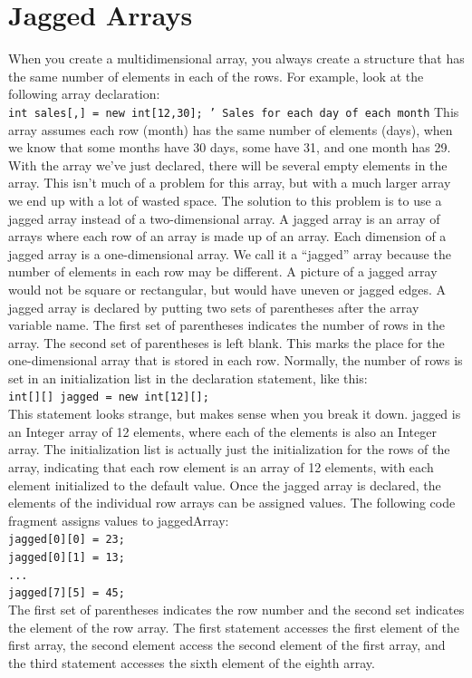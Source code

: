 \documentclass[12pt,a4paper,final,twoside,titlepage]{book}
\begin{document}
\section{Jagged Arrays}
When you create a multidimensional array, you always create a structure that has the same number of elements in each of the rows. For example, look at the following array declaration:\\
\texttt{int sales[,] = new int[12,30]; ' Sales for each day of each month}
This array assumes each row (month) has the same number of elements (days), when we know that some months have 30 days, some have 31, and one month has 29. With the array we’ve just declared, there will be several empty elements in the array. This isn’t much of a problem for this array, but with a much larger array we end up with a lot of wasted space.
The solution to this problem is to use a jagged array instead of a two-dimensional array. A jagged array is an array of arrays where each row of an array is made up of an array. Each dimension of a jagged array is a one-dimensional array. We call it a “jagged” array because the number of elements in each row may be different. A picture of a jagged array would not be square or rectangular, but would have uneven or jagged edges.
A jagged array is declared by putting two sets of parentheses after the array variable name. The first set of parentheses indicates the number of rows in the array. The second set of parentheses is left blank. This marks the place for the one-dimensional array that is stored in each row. Normally, the number of rows is set in an initialization list in the declaration statement, like this:\\
\texttt{int[][] jagged = new int[12][];}\\
This statement looks strange, but makes sense when you break it down. jagged is an Integer array of 12 elements, where each of the elements is also an Integer array. The initialization list is actually just the initialization for the rows of the array, indicating that each row element is an array of 12 elements, with each element initialized to the default value.
Once the jagged array is declared, the elements of the individual row arrays can be assigned values. The following code fragment assigns values to jaggedArray:\\
\texttt{jagged[0][0] = 23; \\jagged[0][1] = 13; \\... \\jagged[7][5] = 45;}\\
The first set of parentheses indicates the row number and the second set indicates the element of the row array. The first statement accesses the first element of the first array, the second element access the second element of the first array, and the third statement accesses the sixth element of the eighth array.
\end{document}
